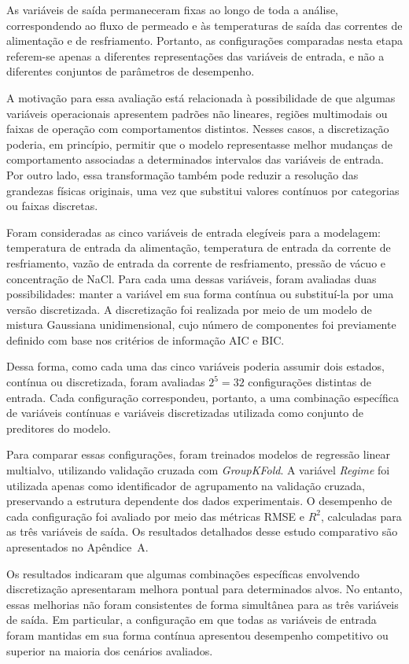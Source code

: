 As variáveis de saída permaneceram fixas ao longo de toda a análise, correspondendo ao fluxo de permeado e às temperaturas de saída das correntes de alimentação e de resfriamento. Portanto, as configurações comparadas nesta etapa referem-se apenas a diferentes representações das variáveis de entrada, e não a diferentes conjuntos de parâmetros de desempenho.

A motivação para essa avaliação está relacionada à possibilidade de que algumas variáveis operacionais apresentem padrões não lineares, regiões multimodais ou faixas de operação com comportamentos distintos. Nesses casos, a discretização poderia, em princípio, permitir que o modelo representasse melhor mudanças de comportamento associadas a determinados intervalos das variáveis de entrada. Por outro lado, essa transformação também pode reduzir a resolução das grandezas físicas originais, uma vez que substitui valores contínuos por categorias ou faixas discretas.

Foram consideradas as cinco variáveis de entrada elegíveis para a modelagem: temperatura de entrada da alimentação, temperatura de entrada da corrente de resfriamento, vazão de entrada da corrente de resfriamento, pressão de vácuo e concentração de NaCl. Para cada uma dessas variáveis, foram avaliadas duas possibilidades: manter a variável em sua forma contínua ou substituí-la por uma versão discretizada. A discretização foi realizada por meio de um modelo de mistura Gaussiana unidimensional, cujo número de componentes foi previamente definido com base nos critérios de informação AIC e BIC.

Dessa forma, como cada uma das cinco variáveis poderia assumir dois estados, contínua ou discretizada, foram avaliadas \(2^5 = 32\) configurações distintas de entrada. Cada configuração correspondeu, portanto, a uma combinação específica de variáveis contínuas e variáveis discretizadas utilizada como conjunto de preditores do modelo.

Para comparar essas configurações, foram treinados modelos de regressão linear multialvo, utilizando validação cruzada com \textit{GroupKFold}. A variável \textit{Regime} foi utilizada apenas como identificador de agrupamento na validação cruzada, preservando a estrutura dependente dos dados experimentais. O desempenho de cada configuração foi avaliado por meio das métricas RMSE e \(R^2\), calculadas para as três variáveis de saída. Os resultados detalhados desse estudo comparativo são apresentados no Apêndice~A.

Os resultados indicaram que algumas combinações específicas envolvendo discretização apresentaram melhora pontual para determinados alvos. No entanto, essas melhorias não foram consistentes de forma simultânea para as três variáveis de saída. Em particular, a configuração em que todas as variáveis de entrada foram mantidas em sua forma contínua apresentou desempenho competitivo ou superior na maioria dos cenários avaliados.

